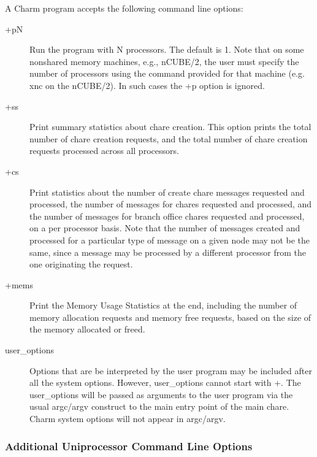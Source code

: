 A Charm program accepts the following command line options:
\begin{description}
\item[{\fexec +pN}] Run the program with N processors. The default is 1.
Note that on some nonshared memory machines, e.g., nCUBE/2, the user must
specify the number of processors using the command provided for that
machine (e.g. {\fexec xnc} on the nCUBE/2).
In such cases the {\fexec +p} option is ignored.
\item[{\fexec +ss}] Print summary statistics about chare creation.  This option
prints the total number of chare creation requests, and the total number of
chare creation requests processed across all processors.
\item[{\fexec +cs}] Print statistics about the number of create chare messages
requested and processed, the number of messages for chares requested and 
processed, and the number of messages for branch office chares requested and
processed, on a per processor basis.  Note that the number of messages 
created and processed for a particular type of message on a given node 
may not be the same, since a message may be processed by a different
processor from the one originating the request.
\item[{\fexec +mems}] Print the Memory Usage Statistics at the end, including
the number of memory allocation requests and memory free requests, based on
the size of the memory allocated or freed.
\item[{\fexec user\_options}] Options that are be interpreted by the user
program may be included after all the system options. 
However, {\fexec user\_options} cannot start with +.
The {\fexec user\_options} will be passed as arguments to the user program 
via the usual {\fcmd argc/argv} construct to the {\fcmd main}
entry point of the main chare. 
Charm system options will not appear in {\fcmd argc/argv}.
\end{description}

\subsubsection[Additional Uniprocessor Command Line Options]
{Additional Uniprocessor Command Line Options}
\label{uniprocessor command line options}

